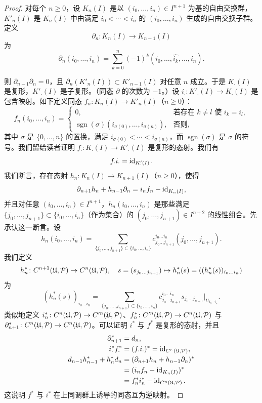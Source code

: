 \begin{proof}
对每个 $n\ge 0$，设 $K_n(I)$ 是以 $(i_0,\dots,i_n)\in I^{n+1}$ 为基的自由交换群，$K'_n(I)$ 是 $K_n(I)$ 中由满足 $i_0<\cdots<i_n$ 的 $(i_0,\dots,i_n)$ 生成的自由交换子群。定义
\[
\partial_n\colon K_n(I)\to K_{n-1}(I)
\]
为
\[
\partial_n(i_0,\dots,i_n)=\sum_{k=0}^n(-1)^k(i_0,\dots,\hat{i_k},\dots,i_n).
\]

则 $\partial_{n-1}\partial_n=0$，且 $\partial_n(K'_n(I))\subset K'_{n-1}(I)$ 对任意 $n$ 成立。于是 $K_\cdot(I)$ 是复形，$K'_\cdot(I)$ 是子复形。（同态 $\partial$ 的次数为 $-1$。）设 $i_\cdot\colon K'_\cdot(I)\to K_\cdot(I)$ 是包含映射。如下定义同态 $f_n\colon K_n(I)\to K'_n(I)$（$n\ge 0$）：
\[
f_n(i_0,\dots,i_n)=
\begin{cases}
0, & \text{若存在 } k\ne l \text{ 使 } i_k=i_l,\\
\operatorname{sgn}(\sigma)(i_{\sigma(0)},\dots,i_{\sigma(n)}), & \text{否则},
\end{cases}
\]
其中 $\sigma$ 是 $\{0,\dots,n\}$ 的置换，满足 $i_{\sigma(0)}<\cdots<i_{\sigma(n)}$，而 $\operatorname{sgn}(\sigma)$ 是 $\sigma$ 的符号。我们留给读者证明 $f_\cdot\colon K_\cdot(I)\to K'_\cdot(I)$ 是复形的态射。我们有
\[
f_\cdot i_\cdot=\operatorname{id}_{K'_\cdot(I)}.
\]
我们断言，存在态射 $h_n\colon K_n(I)\to K_{n+1}(I)$（$n\ge 0$），使得
\[
\partial_{n+1}h_n+h_{n-1}\partial_n=i_nf_n-\operatorname{id}_{K_n(I)},
\]
并且对任意 $(i_0,\dots,i_n)\in I^{n+1}$，$h_n(i_0,\dots,i_n)$ 是那些满足 $\{j_0,\dots,j_{n+1}\}\subset\{i_0,\dots,i_n\}$（作为集合）的 $(j_0,\dots,j_{n+1})\in I^{n+2}$ 的线性组合。先承认这一断言。设
\[
h_n(i_0,\dots,i_n)=\sum_{\{j_0,\dots,j_{n+1}\}\subset\{i_0,\dots,i_n\}}c^{i_0\dots i_n}_{j_0\dots j_{n+1}}(j_0,\dots,j_{n+1}).
\]
我们定义
\[
h^*_n\colon C^{n+1}(\mathfrak{U},\mathcal{P})\to C^n(\mathfrak{U},\mathcal{P}),\quad s=(s_{j_0\dots j_{n+1}})\mapsto h^*_n(s)=((h^*_n(s))_{i_0\dots i_n})
\]
为
\[
(h^*_n(s))_{i_0\dots i_n}=\sum_{\{j_0,\dots,j_{n+1}\}\subset\{i_0,\dots,i_n\}}c^{i_0\dots i_n}_{j_0\dots j_{n+1}}s_{j_0\dots j_{n+1}}|_{U_{i_0\dots i_n}}.
\]
类似地定义 $i^*_n\colon C^n(\mathfrak{U},\mathcal{P})\to C'^n(\mathfrak{U},\mathcal{P})$、$f^*_n\colon C'^n(\mathfrak{U},\mathcal{P})\to C^n(\mathfrak{U},\mathcal{P})$ 与 $\partial^*_{n+1}\colon C^n(\mathfrak{U},\mathcal{P})\to C^n(\mathfrak{U},\mathcal{P})$。可以证明 $i^*$ 与 $f^*$ 是复形的态射，并且
\begin{align*}
\partial^*_{n+1}&=d_n,\\
i^*_\cdot f^*_\cdot&=(f_\cdot i_\cdot)^*=\operatorname{id}_{C'^\cdot(\mathfrak{U},\mathcal{P})},\\
d_{n-1}h^*_{n-1}+h^*_nd_n&=(\partial_{n+1}h_n+h_{n-1}\partial_n)^*\\
&=(i_nf_n-\operatorname{id}_{K_n(I)})^*\\
&=f^*_ni^*_n-\operatorname{id}_{C^n(\mathfrak{U},\mathcal{P})}.
\end{align*}
这说明 $f^*$ 与 $i^*$ 在上同调群上诱导的同态互为逆映射。


\end{proof}
